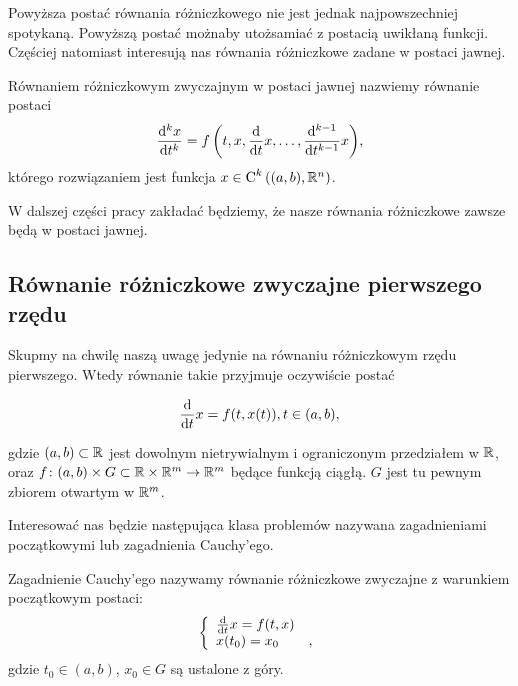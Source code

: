 \documentclass[12pt,a4paper]{report}
\begin{document}
Powyższa postać równania różniczkowego nie jest jednak najpowszechniej spotykaną. Powyższą postać możnaby utożsamiać z postacią uwikłaną funkcji. Częściej natomiast interesują nas równania różniczkowe zadane w postaci jawnej.

\begin{definition}
Równaniem różniczkowym zwyczajnym w postaci jawnej nazwiemy równanie postaci
$$
\ddx[{^k x}]{t^k} = \function{f}{t,x,\ddx{t}x, \ldots, \ddx[{^{k-1}}]{t^{k-1}} x},
$$
którego rozwiązaniem jest funkcja $x \in \Ck{k}{(a,b), \setR^n}$.
\end{definition}

W dalszej części pracy zakładać będziemy, że nasze równania różniczkowe zawsze będą w postaci jawnej.


\subsection{Równanie różniczkowe zwyczajne pierwszego rzędu}

Skupmy na chwilę naszą uwagę jedynie na równaniu różniczkowym rzędu pierwszego. Wtedy równanie takie przyjmuje oczywiście postać 

$$
\ddx{t}x = f(t,x(t)), t \in (a,b) ,
$$ 

gdzie $(a,b) \subset \setR$ jest dowolnym nietrywialnym i ograniczonym przedziałem w $\setR$, oraz $ f \colon (a,b) \times G \subset \setR \times \setR^m \to \setR^m$ będące funkcją ciągłą. $G$ jest tu pewnym zbiorem otwartym w $\setR^m$. 

Interesować nas będzie następująca klasa problemów nazywana zagadnieniami początkowymi lub zagadnienia Cauchy'ego.

\begin{problem} 
Zagadnienie Cauchy'ego nazywamy równanie różniczkowe zwyczajne z warunkiem początkowym postaci:
\begin{equation} \label{prob-zagadnienie-cauchy}
\left\{\begin{array}{ll}
\ddx{t} x = f(t,x) & \\
x(t_0) = x_0 &,
\end{array} \right.
\end{equation}
gdzie $t_0 \in (a,b)$, $x_0 \in G$ są ustalone z góry. 
\end{problem}
\end{document}
